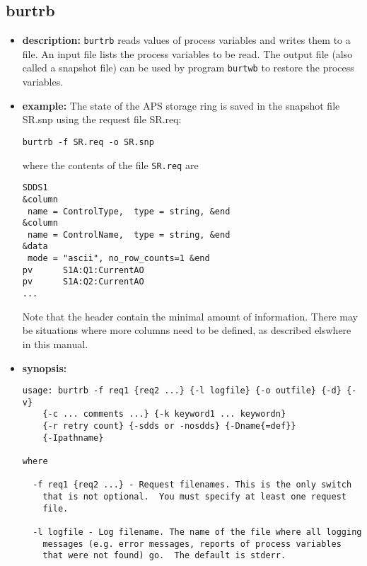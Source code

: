 %
%
\begin{latexonly}
\newpage
\end{latexonly}

%
%
\subsection{burtrb}
\label{burtrb}

\begin{itemize}
\item {\bf description:}
%
%
\verb+burtrb+ reads values of process variables and writes them to a file.
An input file lists the process variables to be read.
The output file (also called a snapshot file) can be used by program \verb+burtwb+
to restore the process variables.
\item {\bf example:} 
%
% 
%
The state of the APS storage ring is saved in the snapshot file SR.snp using the 
request file SR.req:
\begin{verbatim}
burtrb -f SR.req -o SR.snp
\end{verbatim}
where the contents of the file \verb+SR.req+ are
\begin{verbatim}
SDDS1
&column
 name = ControlType,  type = string, &end
&column
 name = ControlName,  type = string, &end
&data
 mode = "ascii", no_row_counts=1 &end
pv      S1A:Q1:CurrentAO        
pv      S1A:Q2:CurrentAO
...
\end{verbatim}
Note that the header contain the minimal amount of information. There may be situations
where more columns need to be defined, as described elswhere in this manual.
\item {\bf synopsis:} 
%
%
\begin{verbatim}
usage: burtrb -f req1 {req2 ...} {-l logfile} {-o outfile} {-d} {-v}
	{-c ... comments ...} {-k keyword1 ... keywordn}
	{-r retry count} {-sdds or -nosdds} {-Dname{=def}}
	{-Ipathname}

where

  -f req1 {req2 ...} - Request filenames. This is the only switch
  	that is not optional.  You must specify at least one request
  	file.

  -l logfile - Log filename. The name of the file where all logging
  	messages (e.g. error messages, reports of process variables
  	that were not found) go.  The default is stderr.


\end{verbatim}
\end{itemize}

